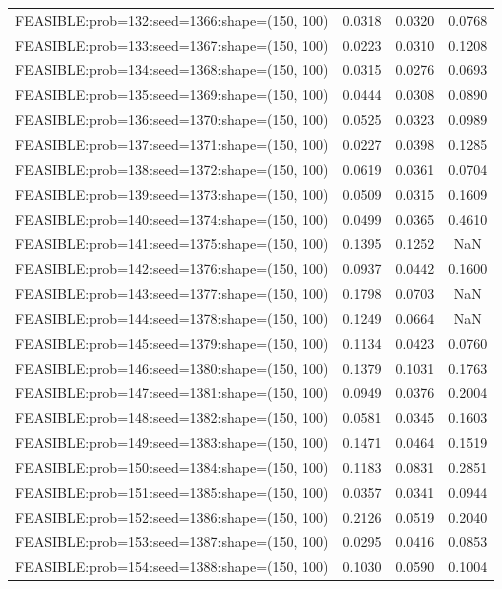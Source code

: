 \begin{longtable}{lccc}
FEASIBLE:prob=132:seed=1366:shape=(150, 100) & 0.0318 & 0.0320 & 0.0768 \\
FEASIBLE:prob=133:seed=1367:shape=(150, 100) & 0.0223 & 0.0310 & 0.1208 \\
FEASIBLE:prob=134:seed=1368:shape=(150, 100) & 0.0315 & 0.0276 & 0.0693 \\
FEASIBLE:prob=135:seed=1369:shape=(150, 100) & 0.0444 & 0.0308 & 0.0890 \\
FEASIBLE:prob=136:seed=1370:shape=(150, 100) & 0.0525 & 0.0323 & 0.0989 \\
FEASIBLE:prob=137:seed=1371:shape=(150, 100) & 0.0227 & 0.0398 & 0.1285 \\
FEASIBLE:prob=138:seed=1372:shape=(150, 100) & 0.0619 & 0.0361 & 0.0704 \\
FEASIBLE:prob=139:seed=1373:shape=(150, 100) & 0.0509 & 0.0315 & 0.1609 \\
FEASIBLE:prob=140:seed=1374:shape=(150, 100) & 0.0499 & 0.0365 & 0.4610 \\
FEASIBLE:prob=141:seed=1375:shape=(150, 100) & 0.1395 & 0.1252 &    NaN \\
FEASIBLE:prob=142:seed=1376:shape=(150, 100) & 0.0937 & 0.0442 & 0.1600 \\
FEASIBLE:prob=143:seed=1377:shape=(150, 100) & 0.1798 & 0.0703 &    NaN \\
FEASIBLE:prob=144:seed=1378:shape=(150, 100) & 0.1249 & 0.0664 &    NaN \\
FEASIBLE:prob=145:seed=1379:shape=(150, 100) & 0.1134 & 0.0423 & 0.0760 \\
FEASIBLE:prob=146:seed=1380:shape=(150, 100) & 0.1379 & 0.1031 & 0.1763 \\
FEASIBLE:prob=147:seed=1381:shape=(150, 100) & 0.0949 & 0.0376 & 0.2004 \\
FEASIBLE:prob=148:seed=1382:shape=(150, 100) & 0.0581 & 0.0345 & 0.1603 \\
FEASIBLE:prob=149:seed=1383:shape=(150, 100) & 0.1471 & 0.0464 & 0.1519 \\
FEASIBLE:prob=150:seed=1384:shape=(150, 100) & 0.1183 & 0.0831 & 0.2851 \\
FEASIBLE:prob=151:seed=1385:shape=(150, 100) & 0.0357 & 0.0341 & 0.0944 \\
FEASIBLE:prob=152:seed=1386:shape=(150, 100) & 0.2126 & 0.0519 & 0.2040 \\
FEASIBLE:prob=153:seed=1387:shape=(150, 100) & 0.0295 & 0.0416 & 0.0853 \\
FEASIBLE:prob=154:seed=1388:shape=(150, 100) & 0.1030 & 0.0590 & 0.1004 \\

\end{longtable}
